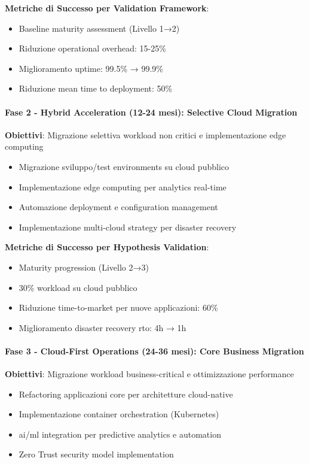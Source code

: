 \textbf{Metriche di Successo per Validation Framework}:
\begin{itemize}
    \item Baseline maturity assessment (Livello 1→2)
    \item Riduzione operational overhead: 15-25\%
    \item Miglioramento uptime: 99.5\% → 99.9\%
    \item Riduzione mean time to deployment: 50\%
\end{itemize}

\paragraph{Fase 2 - Hybrid Acceleration (12-24 mesi): Selective Cloud Migration}

\textbf{Obiettivi}: Migrazione selettiva workload non critici e implementazione edge computing
\begin{itemize}
    \item Migrazione sviluppo/test environments su cloud pubblico
    \item Implementazione edge computing per analytics real-time
    \item Automazione deployment e configuration management
    \item Implementazione multi-cloud strategy per disaster recovery
\end{itemize}

\textbf{Metriche di Successo per Hypothesis Validation}:
\begin{itemize}
    \item Maturity progression (Livello 2→3)
    \item 30\% workload su cloud pubblico
    \item Riduzione time-to-market per nuove applicazioni: 60\%
    \item Miglioramento disaster recovery \gls{rto}: 4h → 1h
\end{itemize}

\paragraph{Fase 3 - Cloud-First Operations (24-36 mesi): Core Business Migration}

\textbf{Obiettivi}: Migrazione workload business-critical e ottimizzazione performance
\begin{itemize}
    \item Refactoring applicazioni core per architetture cloud-native
    \item Implementazione container orchestration (Kubernetes)
    \item \gls{ai}/\gls{ml} integration per predictive analytics e automation
    \item Zero Trust security model implementation
\end{itemize}

